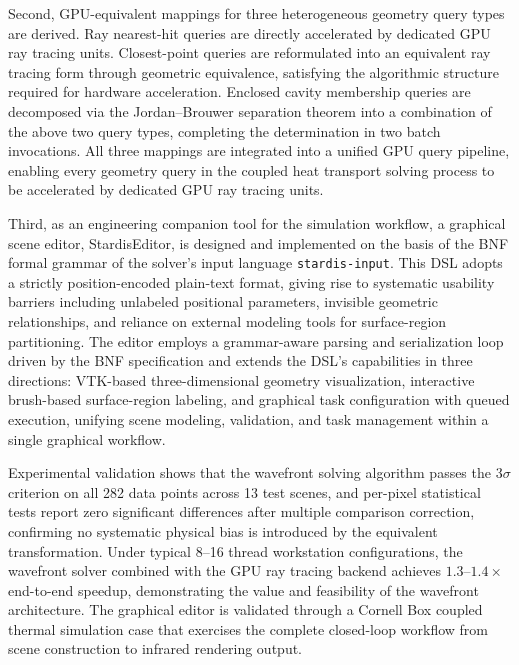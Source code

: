 \begin{ENGabstract}
Second, GPU-equivalent mappings for three heterogeneous geometry query types are derived. Ray nearest-hit queries are directly accelerated by dedicated GPU ray tracing units. Closest-point queries are reformulated into an equivalent ray tracing form through geometric equivalence, satisfying the algorithmic structure required for hardware acceleration. Enclosed cavity membership queries are decomposed via the Jordan--Brouwer separation theorem into a combination of the above two query types, completing the determination in two batch invocations. All three mappings are integrated into a unified GPU query pipeline, enabling every geometry query in the coupled heat transport solving process to be accelerated by dedicated GPU ray tracing units.

Third, as an engineering companion tool for the simulation workflow, a graphical scene editor, StardisEditor, is designed and implemented on the basis of the BNF formal grammar of the solver's input language \texttt{stardis-input}. This DSL adopts a strictly position-encoded plain-text format, giving rise to systematic usability barriers including unlabeled positional parameters, invisible geometric relationships, and reliance on external modeling tools for surface-region partitioning. The editor employs a grammar-aware parsing and serialization loop driven by the BNF specification and extends the DSL's capabilities in three directions: VTK-based three-dimensional geometry visualization, interactive brush-based surface-region labeling, and graphical task configuration with queued execution, unifying scene modeling, validation, and task management within a single graphical workflow.

Experimental validation shows that the wavefront solving algorithm passes the $3\sigma$ criterion on all 282 data points across 13 test scenes, and per-pixel statistical tests report zero significant differences after multiple comparison correction, confirming no systematic physical bias is introduced by the equivalent transformation. Under typical 8--16 thread workstation configurations, the wavefront solver combined with the GPU ray tracing backend achieves $1.3$--$1.4\times$ end-to-end speedup, demonstrating the value and feasibility of the wavefront architecture. The graphical editor is validated through a Cornell Box coupled thermal simulation case that exercises the complete closed-loop workflow from scene construction to infrared rendering output.
\end{ENGabstract}

